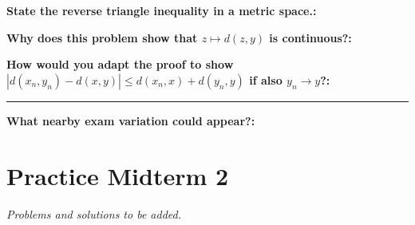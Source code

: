 \documentclass[12pt]{article}
\newcommand{\fillfield}[1]{%
  \par\noindent\textbf{#1:}\enspace\hrulefill\par\vspace{3pt}%
}
\newcommand{\fillfieldlong}[1]{%
  \par\noindent\textbf{#1:}\par\vspace{1.5cm}%
  \noindent\rule{\linewidth}{0.35pt}\par\vspace{4pt}%
}
\begin{document}
\bigskip

\begin{tcolorbox}[
  enhanced, breakable,
  colback  = reflectcyan,
  colframe = cyan!55!black,
  fonttitle = \bfseries,
  title = {\textsc{Reflection \& Variation}}
]
\fillfield{State the reverse triangle inequality in a metric space.}
\fillfield{Why does this problem show that $z\mapsto d(z,y)$ is continuous?}
\fillfieldlong{How would you adapt the proof to show $|d(x_n,y_n)-d(x,y)| \le d(x_n,x)+d(y_n,y)$ if also $y_n\to y$?}
\fillfield{What nearby exam variation could appear?}
\end{tcolorbox}

\newpage
\section{Practice Midterm 2}
\textit{Problems and solutions to be added.}
\end{document}
